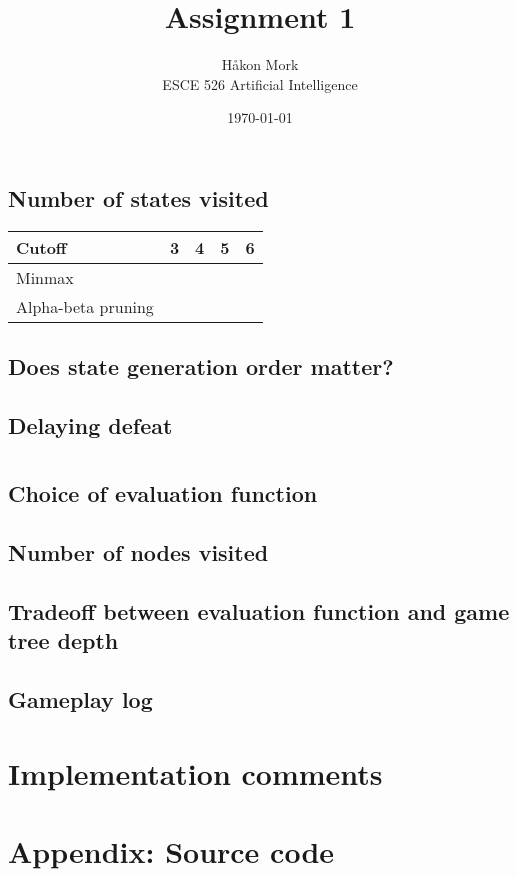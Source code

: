 \documentclass[letterpaper, 12pt]{article}
\title{\textbf{Assignment 1}}
\author{Håkon Mork \\ ESCE 526 Artificial Intelligence}
\date{\today}
\numberwithin{theorem}{section}
\begin{document}
\maketitle
\noindent

\section{}
\subsection{Number of states visited}
\begin{table}[h]
	\centering
	\small
	\begin{tabular}{lcccc}
		Cutoff & 3 & 4 & 5 & 6 \\
		\midrule
		Minmax & &&& \\
		Alpha-beta pruning &&&&
	\end{tabular}
\end{table}


\subsection{Does state generation order matter?}

\subsection{Delaying defeat}

\section{}
\subsection{Choice of evaluation function}

\subsection{Number of nodes visited}

\subsection{Tradeoff between evaluation function and game tree depth}

\subsection{Gameplay log}

\section*{Implementation comments}

\clearpage
\section*{Appendix: Source code}

\end{document}
